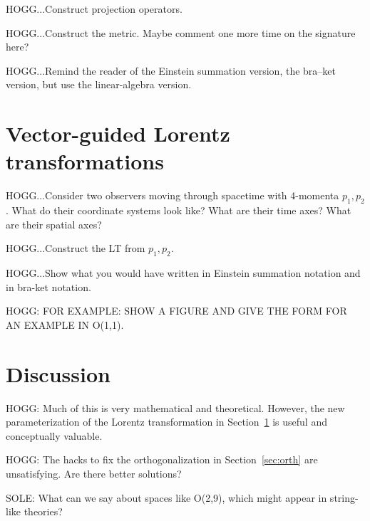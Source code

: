 \documentclass{article}
\newcommand{\secref}[1]{Section~\ref{#1}}
\begin{document}
HOGG...Construct projection operators.

HOGG...Construct the metric. Maybe comment one more time on the signature here?

HOGG...Remind the reader of the Einstein summation version, the bra--ket version, but use the linear-algebra version.

\section{Vector-guided Lorentz transformations}\label{sec:lt}

HOGG...Consider two observers moving through spacetime with 4-momenta $p_1,p_2$.
What do their coordinate systems look like?
What are their time axes?
What are their spatial axes?

HOGG...Construct the LT from $p_1, p_2$.

HOGG...Show what you would have written in Einstein summation notation and in bra-ket notation.

HOGG: FOR EXAMPLE: SHOW A FIGURE AND GIVE THE FORM FOR AN EXAMPLE IN O(1,1).

\section{Discussion}\label{sec:discussion}

HOGG: Much of this is very mathematical and theoretical.
However, the new parameterization of the Lorentz transformation in \secref{sec:lt} is useful and conceptually valuable.

HOGG: The hacks to fix the orthogonalization in \secref{sec:orth} are unsatisfying. Are there better solutions?

SOLE: What can we say about spaces like O(2,9), which might appear in string-like theories?

\raggedright
\printbibliography
\end{document}

